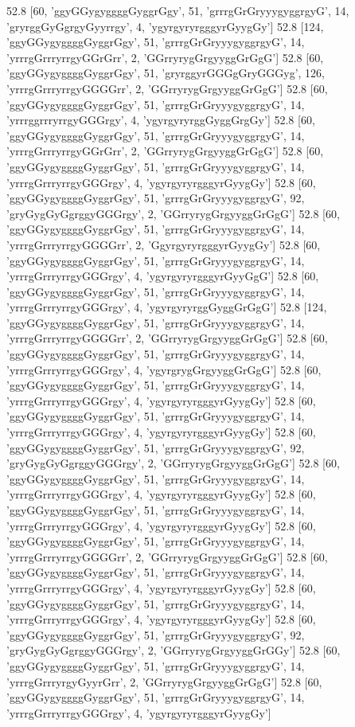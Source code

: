 52.8 [60, 'ggyGGygyggggGyggrGgy', 51, 'grrrgGrGryyygyggrgyG', 14, 'gryrggGyGgrgyGyyrrgy', 4, 'ygyrgyryrgggyrGyygGy']
52.8 [124, 'ggyGGygyggggGyggrGgy', 51, 'grrrgGrGryyygyggrgyG', 14, 'yrrrgGrrryrrgyGGrGrr', 2, 'GGrryrygGrgyyggGrGgG']
52.8 [60, 'ggyGGygyggggGyggrGgy', 51, 'gryrggyrGGGgGryGGGyg', 126, 'yrrrgGrrryrrgyGGGGrr', 2, 'GGrryrygGrgyyggGrGgG']
52.8 [60, 'ggyGGygyggggGyggrGgy', 51, 'grrrgGrGryyygyggrgyG', 14, 'yrrrggrrryrrgyGGGrgy', 4, 'ygyrgyryrggGyggGrgGy']
52.8 [60, 'ggyGGygyggggGyggrGgy', 51, 'grrrgGrGryyygyggrgyG', 14, 'yrrrgGrrryrrgyGGrGrr', 2, 'GGrryrygGrgyyggGrGgG']
52.8 [60, 'ggyGGygyggggGyggrGgy', 51, 'grrrgGrGryyygyggrgyG', 14, 'yrrrgGrrryrrgyGGGrgy', 4, 'ygyrgyryrgggyrGyygGy']
52.8 [60, 'ggyGGygyggggGyggrGgy', 51, 'grrrgGrGryyygyggrgyG', 92, 'gryGygGyGgrggyGGGrgy', 2, 'GGrryrygGrgyyggGrGgG']
52.8 [60, 'ggyGGygyggggGyggrGgy', 51, 'grrrgGrGryyygyggrgyG', 14, 'yrrrgGrrryrrgyGGGGrr', 2, 'GgyrgyryrgggyrGyygGy']
52.8 [60, 'ggyGGygyggggGyggrGgy', 51, 'grrrgGrGryyygyggrgyG', 14, 'yrrrgGrrryrrgyGGGrgy', 4, 'ygyrgyryrgggyrGyyGgG']
52.8 [60, 'ggyGGygyggggGyggrGgy', 51, 'grrrgGrGryyygyggrgyG', 14, 'yrrrgGrrryrrgyGGGrgy', 4, 'ygyrgyryrggGyggGrGgG']
52.8 [124, 'ggyGGygyggggGyggrGgy', 51, 'grrrgGrGryyygyggrgyG', 14, 'yrrrgGrrryrrgyGGGGrr', 2, 'GGrryrygGrgyyggGrGgG']
52.8 [60, 'ggyGGygyggggGyggrGgy', 51, 'grrrgGrGryyygyggrgyG', 14, 'yrrrgGrrryrrgyGGGrgy', 4, 'ygyrgrygGrgyyggGrGgG']
52.8 [60, 'ggyGGygyggggGyggrGgy', 51, 'grrrgGrGryyygyggrgyG', 14, 'yrrrgGrrryrrgyGGGrgy', 4, 'ygyrgyryrgggyrGyygGy']
52.8 [60, 'ggyGGygyggggGyggrGgy', 51, 'grrrgGrGryyygyggrgyG', 14, 'yrrrgGrrryrrgyGGGrgy', 4, 'ygyrgyryrgggyrGyygGy']
52.8 [60, 'ggyGGygyggggGyggrGgy', 51, 'grrrgGrGryyygyggrgyG', 92, 'gryGygGyGgrggyGGGrgy', 2, 'GGrryrygGrgyyggGrGgG']
52.8 [60, 'ggyGGygyggggGyggrGgy', 51, 'grrrgGrGryyygyggrgyG', 14, 'yrrrgGrrryrrgyGGGrgy', 4, 'ygyrgyryrgggyrGyygGy']
52.8 [60, 'ggyGGygyggggGyggrGgy', 51, 'grrrgGrGryyygyggrgyG', 14, 'yrrrgGrrryrrgyGGGrgy', 4, 'ygyrgyryrgggyrGyygGy']
52.8 [60, 'ggyGGygyggggGyggrGgy', 51, 'grrrgGrGryyygyggrgyG', 14, 'yrrrgGrrryrrgyGGGGrr', 2, 'GGrryrygGrgyyggGrGgG']
52.8 [60, 'ggyGGygyggggGyggrGgy', 51, 'grrrgGrGryyygyggrgyG', 14, 'yrrrgGrrryrrgyGGGrgy', 4, 'ygyrgyryrgggyrGyygGy']
52.8 [60, 'ggyGGygyggggGyggrGgy', 51, 'grrrgGrGryyygyggrgyG', 14, 'yrrrgGrrryrrgyGGGrgy', 4, 'ygyrgyryrgggyrGyygGy']
52.8 [60, 'ggyGGygyggggGyggrGgy', 51, 'grrrgGrGryyygyggrgyG', 92, 'gryGygGyGgrggyGGGrgy', 2, 'GGrryrygGrgyyggGrGGy']
52.8 [60, 'ggyGGygyggggGyggrGgy', 51, 'grrrgGrGryyygyggrgyG', 14, 'yrrrgGrrryrgyGyyrGrr', 2, 'GGrryrygGrgyyggGrGgG']
52.8 [60, 'ggyGGygyggggGyggrGgy', 51, 'grrrgGrGryyygyggrgyG', 14, 'yrrrgGrrryrrgyGGGrgy', 4, 'ygyrgyryrgggyrGyygGy']
